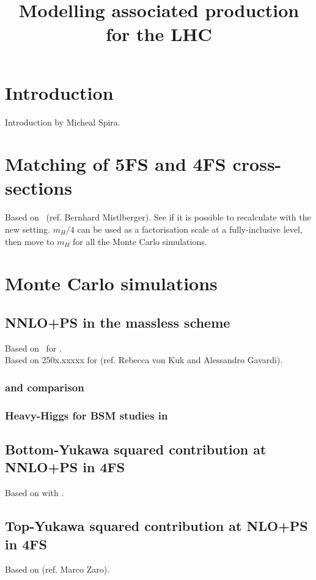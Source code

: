 \documentclass[11pt,a4paper]{article}
\title{Modelling associated \bbH{} production for the LHC}
\begin{document}
\maketitle
\flushbottom

\section{Introduction}
Introduction by Micheal Spira.

\section{Matching of \fnnnlo{} 5FS and \fnlo{} 4FS cross-sections}
Based on~\cite{Duhr:2020kzd} (ref. Bernhard Mistlberger). See if it is possible to recalculate with the new setting. $m_H/4$ can be used as a factorisation scale at a fully-inclusive level, then move to $m_H$ for all the Monte Carlo simulations.

\section{Monte Carlo simulations}

\subsection{NNLO+PS in the massless scheme}
Based on~\cite{Biello:2024vdh} for \minnlo{}.\\
Based on 250x.xxxxx for \GENEVA{} (ref. Rebecca von Kuk and Alessandro Gavardi).

\subsubsection{\minnlo{} and \GENEVA{} comparison}
\subsubsection{Heavy-Higgs for BSM studies in \minnlo{}}

\subsection{Bottom-Yukawa squared contribution at NNLO+PS in 4FS}
Based on \cite{Biello:2024pgo} with \minnlo{}.

\subsection{Top-Yukawa squared contribution at NLO+PS in 4FS}
Based on \cite{Manzoni:2023qaf} (ref. Marco Zaro).
\end{document}
